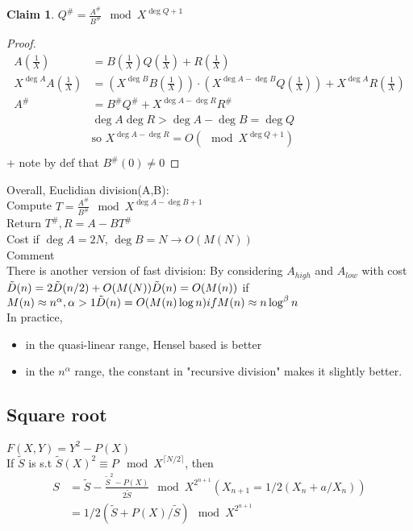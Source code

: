 \documentclass{article}
\newtheorem{claim}{Claim}
\theoremstyle{definition}
\theoremstyle{remark}
\newcommand{\Proof}[1]{\begin{proof}#1\end{proof}}
\begin{document}
\begin{claim}
	$Q^\# = \frac{A^\#}{B^\#} \mod X^{\deg Q + 1}$
\end{claim}
\Proof{\begin{align*}
	A(\frac{1}{X}) & = B(\frac{1}{X})Q(\frac{1}{X}) + R(\frac{1}{X})\\
	X^{\deg A} A(\frac{1}{X}) & = (X^{\deg B} B(\frac{1}{X}))\cdot(X^{\deg A - \deg B}Q(\frac{1}{X})) + X^{\deg A} R(\frac{1}{X})\\
	A^\# & = B^\# Q^\# + X^{\deg A - \deg R}R^\#\\
	& \deg A \deg R > \deg A - \deg B = \deg Q\\
	& \text{so } X^{\deg A - \deg R} = O(\mod X^{\deg Q + 1})\\
	\end{align*}
	+ note by def that $B^\#(0) \neq 0$}

Overall, Euclidian division(A,B):\\
Compute $T = \frac{A^\#}{B^\#} \mod X^{\deg A - \deg B + 1}$\\
Return $T^\#, R = A-BT^\#$\\

Cost if $\deg A = 2N$, $\deg B = N \rightarrow O(M(N))$\\

Comment\\
There is another version of fast division: By considering $A_{high}$ and $A_{low}$ with cost $\tilde{D}(n) = 2\tilde{D}(n/2) + O(M(N))\\
\tilde{D}(n) = O(M(n))$ if $M(n)\approx n^\alpha, \alpha > 1\\
\tilde{D}(n) = O(M(n)\log n) if M(n) \approx n\log^\beta n$\\

In practice,\begin{itemize}
	\item in the quasi-linear range, Hensel based is better
	\item in the $n^\alpha$ range, the constant in "recursive division" makes it slightly better.
\end{itemize}

\subsection{Square root}
$F(X,Y) = Y^2 - P(X)$\\
If $\tilde{S}$ is s.t $\tilde{S}(X)^2 \equiv P \mod X^{\lceil N/2 \rceil}$, then \begin{align*}
S & = \tilde{S} - \frac{\tilde{S}^2 - P(X)}{2 \tilde{S}} \mod X^{2^{n+1}} (X_{n+1} = 1/2(X_n + a/X_n))\\
& = 1/2(\tilde{S} +  P(X)/\tilde{S}) \mod X^{2^{n+1}}
\end{align*}
\end{document}
